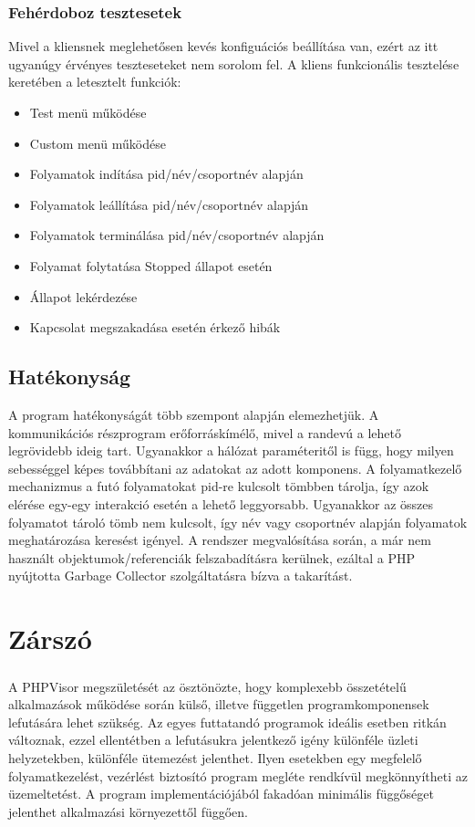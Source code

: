 \documentclass[12pt]{report}
\begin{document}
\subsection{Fehérdoboz tesztesetek}
Mivel a kliensnek meglehetősen kevés konfiguációs beállítása van, ezért az itt ugyanúgy érvényes teszteseteket nem sorolom fel. A kliens funkcionális tesztelése keretében a letesztelt funkciók:
\begin{itemize}
\item Test menü működése
\item Custom menü működése
\item Folyamatok indítása pid/név/csoportnév alapján
\item Folyamatok leállítása pid/név/csoportnév alapján
\item Folyamatok terminálása pid/név/csoportnév alapján
\item Folyamat folytatása Stopped állapot esetén
\item Állapot lekérdezése
\item Kapcsolat megszakadása esetén érkező hibák
\end{itemize}

\section{Hatékonyság}
A program hatékonyságát több szempont alapján elemezhetjük. A kommunikációs részprogram erőforráskímélő, mivel a randevú a lehető legrövidebb ideig tart. Ugyanakkor a hálózat paraméteritől is függ, hogy milyen sebességgel képes továbbítani az adatokat az adott komponens.
A folyamatkezelő mechanizmus a futó folyamatokat pid-re kulcsolt tömbben tárolja, így azok elérése egy-egy interakció esetén a lehető leggyorsabb. Ugyanakkor az összes folyamatot tároló tömb nem kulcsolt, így név vagy csoportnév alapján folyamatok meghatározása keresést igényel.
A rendszer megvalósítása során, a már nem használt objektumok/referenciák felszabadításra kerülnek, ezáltal a PHP nyújtotta Garbage Collector szolgáltatásra bízva a takarítást.
  
\chapter{Zárszó} 
\paragraph{}
A PHPVisor megszületését az ösztönözte, hogy komplexebb összetételű alkalmazások működése során külső, illetve független programkomponensek lefutására lehet szükség.
Az egyes futtatandó programok ideális esetben ritkán változnak, ezzel ellentétben a lefutásukra jelentkező igény különféle üzleti helyzetekben, különféle ütemezést jelenthet.
Ilyen esetekben egy megfelelő folyamatkezelést, vezérlést biztosító program megléte rendkívül megkönnyítheti az üzemeltetést. A program implementációjából fakadóan minimális függőséget jelenthet alkalmazási környezettől függően.
\end{document}
